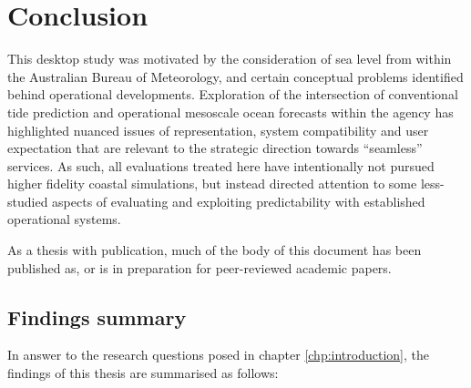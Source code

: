 \chapter{Conclusion}
\label{chp:conclusions}
This desktop study was motivated by the consideration of sea level from within the Australian Bureau of Meteorology, and certain conceptual problems identified behind operational developments.
Exploration of the intersection of conventional tide prediction and operational mesoscale ocean forecasts within the agency has highlighted nuanced issues of representation, system compatibility and user expectation that are relevant to the strategic direction towards ``seamless'' services.
As such, all evaluations treated here have intentionally not pursued higher fidelity coastal simulations, but instead directed attention to some less-studied aspects of evaluating and exploiting predictability with established operational systems.   

As a thesis with publication, much of the body of this document has been published as, or is in preparation for peer-reviewed academic papers.
\section{Findings summary}
In answer to the research questions posed in chapter \ref{chp:introduction},  the findings of this thesis are summarised as follows:\\
